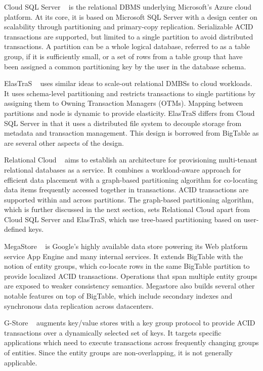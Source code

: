 \documentclass[10pt,final,journal]{IEEEtran}
\begin{document}
Cloud SQL Server ~\cite{Campbell:2010:ESF:1807167.1807280, Bernstein:2011:AMS:2004686.2005651} is the relational DBMS underlying Microsoft's Azure cloud platform. At its core, it is based on Microsoft SQL Server with a design center on scalability through partitioning and primary-copy replication. Serializable ACID transactions are supported, but limited to a single partition to avoid distributed transactions. A partition can be a whole logical database, referred to as a table group, if it is sufficiently small, or a set of rows from a table group that have been assigned a common partitioning key by the user in the database schema.

ElasTraS ~\cite{Das:2009:EET:1855533.1855540, Das:2010:EAE} uses similar ideas to scale-out relational DMBSs to cloud workloads. It uses schema-level partitioning and restricts transactions to single partitions by assigning them to Owning Transaction Managers (OTMs). Mapping between partitions and node is dynamic to provide elasticity. ElasTraS differs from Cloud SQL Server in that it uses a distributed file system to decouple storage from metadata and transaction management. This design is borrowed from BigTable as are several other aspects of the design.

Relational Cloud ~\cite{Curino:2011:JPMWMBZ11} aims to establish an architecture for provisioning multi-tenant relational databases as a service. It combines a workload-aware approach for efficient data placement with a graph-based partitioning algorithm for co-locating data items frequently accessed together in transactions. ACID transactions are supported within and across partitions. The graph-based partitioning algorithm, which is further discussed in the next section,  sets Relational Cloud apart from Cloud SQL Server and ElasTraS, which use tree-based partitioning based on user-defined keys.

MegaStore ~\cite{Furman:2008:8530095, Baker:2011:8530095} is Google's highly available data store powering its Web platform service App Engine and many internal services. It extends BigTable with the notion of entity groups, which co-locate rows in the same BigTable partition to provide localized ACID transactions. Operations that span multiple entity groups are exposed to weaker consistency semantics. Megastore also builds several other notable features on top of BigTable, which include secondary indexes and synchronous data replication across datacenters.

G-Store ~\cite{Das:2010:GSD:1807128.1807157} augments key/value stores with a key group protocol to provide ACID transactions over a dynamically selected set of keys. It targets specific applications which need to execute transactions across frequently changing groups of entities. Since the entity groups are non-overlapping, it is not generally applicable.
\end{document}
